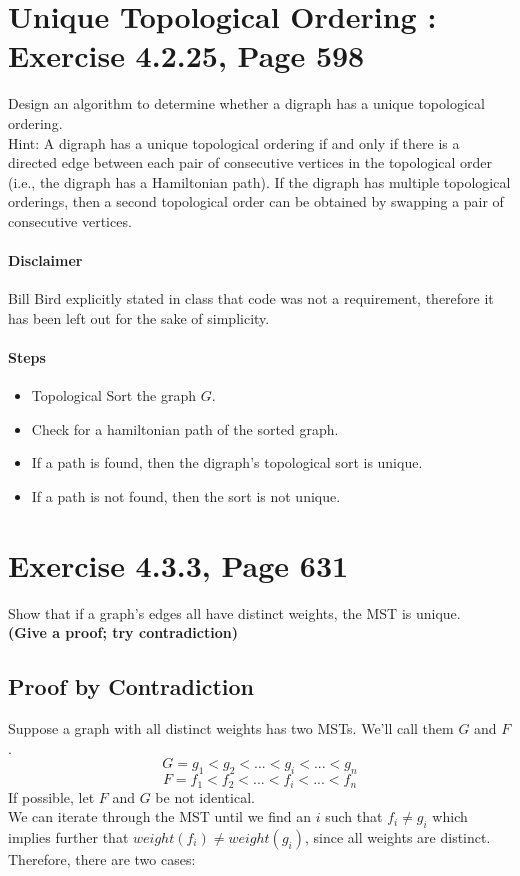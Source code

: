 \documentclass[12pt]{article}
\begin{document}
\section{Unique Topological Ordering : Exercise 4.2.25, Page 598}
Design an algorithm to determine whether a digraph has a unique topological ordering. \\
Hint: A digraph has a unique topological ordering if and only if there is a directed edge between each pair of consecutive vertices in the topological order (i.e., the digraph has a Hamiltonian path). If the digraph has multiple topological orderings, then a second topological order can be obtained by swapping a pair of consecutive vertices.

\paragraph{Disclaimer}
Bill Bird explicitly stated in class that code was not a requirement, therefore it has been left out for the sake of simplicity.
\paragraph{Steps}
\begin{itemize}
	\item Topological Sort the graph $G$.
	\item Check for a hamiltonian path of the sorted graph.
	\item If a path is found, then the digraph's topological sort is unique.
	\item If a path is not found, then the sort is not unique.
\end{itemize}

\section{Exercise 4.3.3, Page 631}
Show that if a graph's edges all have distinct weights, the MST is unique. \\
{\bf (Give a proof; try contradiction)} \\

\subsection{Proof by Contradiction}
Suppose a graph with all distinct weights has two MSTs. We'll call them $G$ and $F$.
$$ G = g_1 < g_2 < ... < g_i < ... < g_n $$
$$ F = f_1 < f_2 < ... < f_i < ... < f_n $$
If possible, let $F$ and $G$ be not identical. \\
We can iterate through the MST until we find an $i$ such that $f_i \neq g_i$ which implies further that $weight(f_i) \neq weight(g_i)$, since all weights are distinct.
Therefore, there are two cases:
\end{document}
